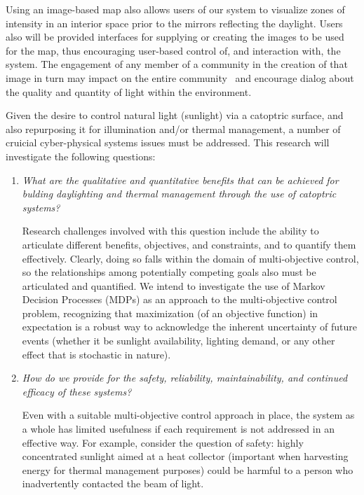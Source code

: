 Using an image-based map 
also allows users of our system to visualize zones of intensity in an interior 
space prior to the mirrors reflecting the daylight. 
Users also will be provided interfaces for supplying or creating the images
to be used for the map, thus encouraging user-based control of, and
interaction with, the system. The engagement of any member of a community 
in the creation of that image in turn may impact on the entire community~\cite{BS13} 
and encourage dialog about the quality and quantity of light within the
environment. 

Given the desire to control natural light (sunlight) via a catoptric surface, and
also repurposing it for illumination and/or thermal management, a number of
cruicial cyber-physical systems issues must be addressed.
This research will investigate the following questions:
\begin{enumerate}

\item \emph{What are the qualitative and quantitative benefits
that can be achieved for bulding daylighting and thermal management
through the use of catoptric systems?}

Research challenges involved with this question include the ability to 
articulate different benefits, objectives, and constraints, and to quantify 
them effectively.  Clearly, doing so falls within the domain
of multi-objective control, so the relationships among potentially competing
goals also must be articulated and quantified. We intend to investigate
the use of Markov Decision Processes (MDPs) as an approach to
the multi-objective control problem, recognizing that maximization
(of an objective function) in expectation is a robust way to acknowledge
the inherent uncertainty of future events (whether it be sunlight availability,
lighting demand, or any other effect that is stochastic in nature).

\item \emph{How do we provide for the safety, reliability, maintainability, and
continued efficacy of these systems?}

Even with a suitable multi-objective control approach in place, the system as
a whole has limited usefulness if each requirement is not
addressed in an effective way.  For example, consider the question of
safety: highly concentrated sunlight aimed at a heat collector (important
when harvesting energy for thermal management purposes) could be harmful
to a person who inadvertently contacted the beam of light. 


\end{enumerate}
